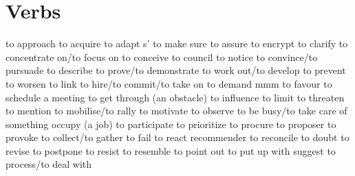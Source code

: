 \section{Verbs}
   {to approach}
   {to acquire}
   {to adapt}
 {s'}   {to make sure}
   {to assure}
   {to encrypt}
   {to clarify}
   {to concentrate on/to focus on}
   {to conceive}
   {to council}
   {to notice}
   {to convince/to pursuade}
   {to describe}
   {to prove/to demonstrate}
   {to work out/to develop}
   {to prevent}
   {to worsen}
   {to link}
   {to hire/to commit/to take on}
   {to demand}
   {mmm}
   {to favour}
   {to schedule a meeting}
   {to get through (an obstacle)}
   {to influence}
   {to limit}
   {to threaten}
   {to mention}
   {to mobilise/to rally}
   {to motivate}
   {to observe}
   {to be busy/to take care of something}
   {occupy (a job)}
   {to participate}
   {to prioritize}
   {to procure}
   {to proposer}
   {to provoke}
   {to collect/to gather}
   {to fail}
   {to react}
   {recommender}
   {to reconcile}
   {to doubt}
   {to revise}
   {to postpone}
   {to resist}
   {to resemble}
   {to point out}
   {to put up with}
   {suggest}
   {to process/to deal with}
